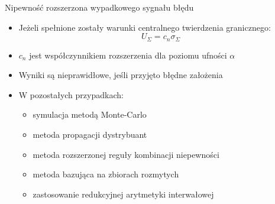 \documentclass[12pt, polish, aspectratio = 169]{beamer}
\begin{document}
\begin{frame}{Nipewność rozszerzona wypadkowego sygnału błędu}
\begin{itemize}
\item Jeżeli spełnione zostały warunki centralnego twierdzenia granicznego:
\begin{equation}
U_{\Sigma} = c_{n} \sigma_{\Sigma} \label{eq:unc_sum}
\end{equation}
\item $c_{n}$ jest współczynnikiem rozszerzenia dla poziomu ufności $\alpha$
\item Wyniki są nieprawidłowe, jeśli przyjęto błędne założenia
\end{itemize}
\begin{itemize}
\item W pozostałych przypadkach:
	\begin{itemize}
	\item symulacja metodą Monte-Carlo
	\item metoda propagacji dystrybuant
	\item metoda rozszerzonej reguły kombinacji niepewności
	\item metoda bazująca na zbiorach rozmytych
	\item zastosowanie redukcyjnej arytmetyki interwałowej
	\end{itemize}
\end{itemize}
\end{frame}
\end{document}
